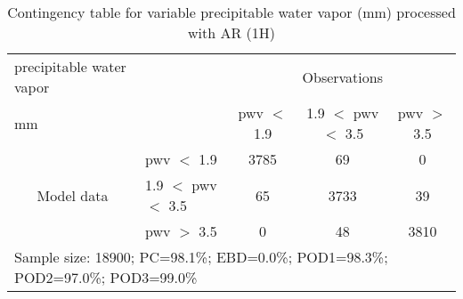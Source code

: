 \begin{table}[]
\begin{center}
\begin{tabular}{llccc}
\hline
{precipitable water vapor}                                       &                                                    & \multicolumn{3}{c}{Observations}                 \\
{mm}                                       &                             & pwv $<$ 1.9   & 1.9 $<$ pwv $<$ 3.5 & pwv $>$ 3.5 \\
\hline
\multicolumn{1}{c}{\multirow{3}{*}{Model data}}  & pwv $<$ 1.9             & 3785                & 69                       & 0              \\
                                                 & 1.9  $<$ pwv $<$ 3.5 & 65                & 3733                       & 39              \\
                                                 & pwv $>$ 3.5             & 0                & 48                       & 3810              \\
\hline 
\multicolumn{5}{l}{Sample size: 18900; PC=98.1\%; EBD=0.0\%; POD1=98.3\%; POD2=97.0\%; POD3=99.0\%}
\end{tabular}
\end{center}
\caption{Contingency table for variable precipitable water vapor (mm) processed with AR (1H)}
\label{tab:contingencypwvAFT}
\end{table}
